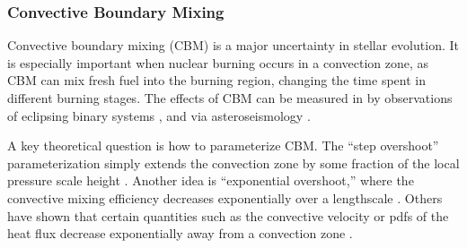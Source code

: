 {\color{purple}
\subsubsection{Convective Boundary Mixing}
}

Convective boundary mixing (CBM) is a major uncertainty in stellar evolution. It is especially important when nuclear burning occurs in a convection zone, as CBM can mix fresh fuel into the burning region, changing the time spent in different burning stages. The effects of CBM can be measured in  by observations of eclipsing binary systems \citep[e.g.,][]{Stancliffe_2015,Valle_2016}, and via asteroseismology \citep[e.g.,][]{Ghasemi_2016}.

A key theoretical question is how to parameterize CBM. The ``step overshoot'' parameterization simply extends the convection zone by some fraction of the local pressure scale height \citep[e.g.,][]{Shaviv_1973}. Another idea is ``exponential overshoot,'' where the convective mixing efficiency decreases exponentially over a lengthscale \citep{Freytag1996}. Others have shown that certain quantities such as the convective velocity or pdfs of the heat flux decrease exponentially away from a convection zone \citep{Pratt_2017}.